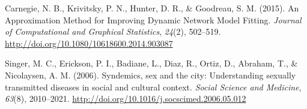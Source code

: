 \documentclass [11pt, proquest] {uwthesis}[2015/03/03]
\begin{document}

\noindent

\setlength{\parindent}{-0.20in} \setlength{\leftskip}{0.20in}
\setlength{\parskip}{8pt}

\hypertarget{refs}{}
\hypertarget{ref-Carnegie2015}{}
Carnegie, N. B., Krivitsky, P. N., Hunter, D. R., \& Goodreau, S. M.
(2015). An Approximation Method for Improving Dynamic Network Model
Fitting. \emph{Journal of Computational and Graphical Statistics},
\emph{24}(2), 502--519.
\url{http://doi.org/10.1080/10618600.2014.903087}

\hypertarget{ref-Singer2006}{}
Singer, M. C., Erickson, P. I., Badiane, L., Diaz, R., Ortiz, D.,
Abraham, T., \& Nicolaysen, A. M. (2006). Syndemics, sex and the city:
Understanding sexually transmitted diseases in social and cultural
context. \emph{Social Science and Medicine}, \emph{63}(8), 2010--2021.
\url{http://doi.org/10.1016/j.socscimed.2006.05.012}
\end{document}
